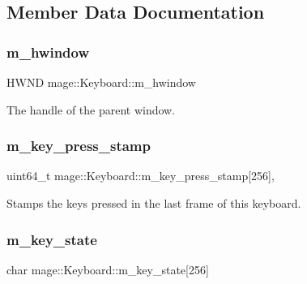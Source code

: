 \subsection{Member Data Documentation}
\hypertarget{classmage_1_1_keyboard_aa7196c689dad6f5aaf35e3929de02791}{}\label{classmage_1_1_keyboard_aa7196c689dad6f5aaf35e3929de02791} 
\subsubsection{\texorpdfstring{m\+\_\+hwindow}{m\_hwindow}}
{\footnotesize\ttfamily H\+W\+ND mage\+::\+Keyboard\+::m\+\_\+hwindow\hspace{0.3cm}{\ttfamily [protected]}}

The handle of the parent window. \hypertarget{classmage_1_1_keyboard_a8eb4ce7e4e2395bb27d2ac9236655335}{}\label{classmage_1_1_keyboard_a8eb4ce7e4e2395bb27d2ac9236655335} 
\subsubsection{\texorpdfstring{m\+\_\+key\+\_\+press\+\_\+stamp}{m\_key\_press\_stamp}}
{\footnotesize\ttfamily uint64\+\_\+t mage\+::\+Keyboard\+::m\+\_\+key\+\_\+press\+\_\+stamp\mbox{[}256\mbox{]}\hspace{0.3cm}{\ttfamily [mutable]}, {\ttfamily [protected]}}

Stamps the keys pressed in the last frame of this keyboard. \hypertarget{classmage_1_1_keyboard_ad3361790f2c9cc5ca19161f0c8e24acd}{}\label{classmage_1_1_keyboard_ad3361790f2c9cc5ca19161f0c8e24acd} 
\subsubsection{\texorpdfstring{m\+\_\+key\+\_\+state}{m\_key\_state}}
{\footnotesize\ttfamily char mage\+::\+Keyboard\+::m\+\_\+key\+\_\+state\mbox{[}256\mbox{]}\hspace{0.3cm}{\ttfamily [protected]}}

